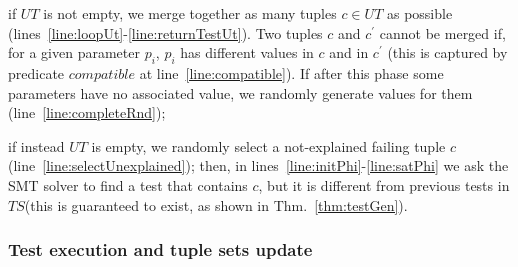 \documentclass[
12pt, %
oneside, %
english, %
singlespacing, %
headsepline, %
consistentlayout, %
]{MastersDoctoralThesis} %
\newcommand{\ts}{\ensuremath{\mathit{TS}}\xspace}
\newcommand{\ut}{\ensuremath{\mathit{UT}}\xspace}
\newcommand{\compatible}{\ensuremath{\mathit{compatible}}\xspace}
\theoremstyle{plain}
\theoremstyle{definition}
\theoremstyle{remark}
\theoremstyle{plain}
\theoremstyle{plain}
\theoremstyle{remark}
\begin{document}
\begin{compactitem}
	\item if \ut is not empty, we merge together as many tuples $c \in \ut$ as possible (lines~\ref{line:loopUt}-\ref{line:returnTestUt}). Two tuples $c$ and $c^\prime$ cannot be merged if, for a given parameter $p_i$, $p_i$ has different values in $c$ and in $c^\prime$ (this is captured by predicate \compatible at line~\ref{line:compatible}). If after this phase some parameters have no associated value, we randomly generate values for them (line~\ref{line:completeRnd});
	\item if instead \ut is empty, we randomly select a not-explained failing tuple $c$ (line~\ref{line:selectUnexplained}); then, in lines~\ref{line:initPhi}-\ref{line:satPhi} we ask the SMT solver to find a test that contains $c$, but it is different from previous tests in \ts (this is guaranteed to exist, as shown in Thm.~\ref{thm:testGen}).
\end{compactitem}


\subsubsection{Test execution and tuple sets update}
\end{document}
